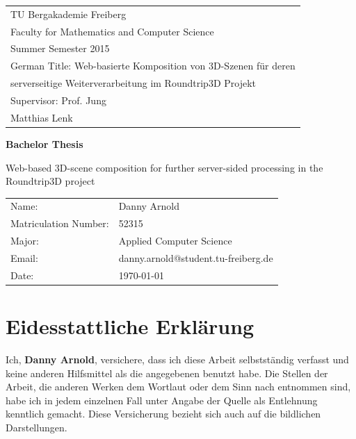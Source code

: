 \documentclass[
	 11pt,         %
	 a4paper,      %
	 oneside,
	 ]{article}
\newcommand{\mytitle}{Web-based 3D-scene composition for further server-sided processing in the Roundtrip3D project}
\newcommand{\myauthor}{Danny Arnold}
\newcommand{\myseminar}{Web-basierte Komposition von 3D-Szenen für deren}
\newcommand{\mydozent}{Prof. Jung}
\newcommand{\mydozentTwo}{Matthias Lenk}
\newcommand{\myseminarTwo}{serverseitige Weiterverarbeitung im Roundtrip3D Projekt}
\newcommand{\mysemester}{Summer Semester 2015}
\newcommand{\emptypage}[0]{
	\clearpage
	\thispagestyle{empty}
	\mbox{}
	\newpage
}
\begin{document}
\begin{titlepage}
\begin{tabular}[l]{l}
TU Bergakademie Freiberg\\
Faculty for Mathematics and Computer Science\\
\mysemester\\
German Title: \myseminar\\
\phantom{German Title: }\myseminarTwo\\
Supervisor: \mydozent\\
\phantom{Supervisor: }\mydozentTwo\\
\end{tabular}

\vspace{4cm}
\begin{center}
\textbf{\large Bachelor Thesis} %
\vspace{0.5\baselineskip}

{\huge
\mytitle
}
\end{center}

\vfill
\begin{tabular}[l]{ll}
Name:           & \myauthor\\
Matriculation Number: & 52315\\
Major:    & Applied Computer Science\\
Email: & danny.arnold@student.tu-freiberg.de\\
Date: & \today \\
\end{tabular}

\end{titlepage}
\newpage

\emptypage

\onehalfspacing


\thispagestyle{empty}
\vspace*{100pt}
\section*{Eidesstattliche Erklärung}
Ich, \textbf{\myauthor}, versichere, dass ich diese Arbeit selbstständig verfasst und keine anderen Hilfsmittel als
die angegebenen benutzt habe. Die Stellen der Arbeit, die anderen Werken dem Wortlaut oder
dem Sinn nach entnommen sind, habe ich in jedem einzelnen Fall unter Angabe der Quelle
als Entlehnung kenntlich gemacht. Diese Versicherung bezieht sich auch auf die bildlichen
Darstellungen.
\vspace*{50pt}
\end{document}

